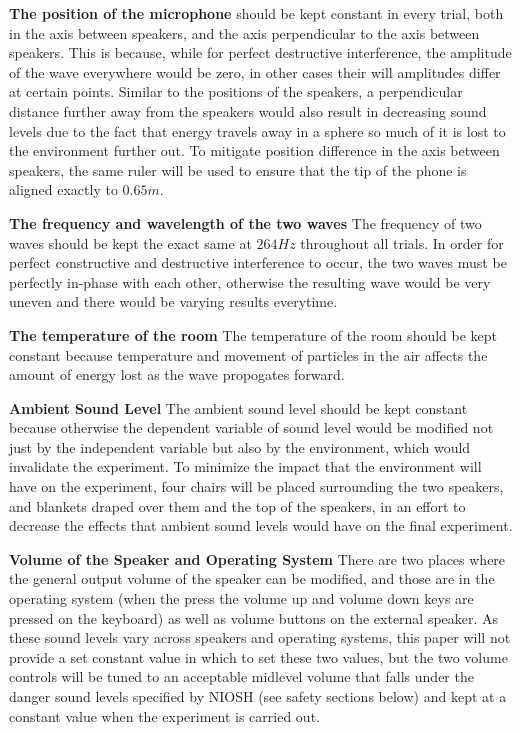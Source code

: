 \documentclass[index]{subfiles}
\begin{document}
\textbf{The position of the microphone} should be kept constant in every trial, both in the axis between speakers, and the axis perpendicular to the axis between speakers. This is because, while for perfect destructive interference, the amplitude of the wave everywhere would be zero, in other cases their will amplitudes differ at certain points. Similar to the positions of the speakers, a perpendicular distance further away from the speakers would also result in decreasing sound levels due to the fact that energy travels away in a sphere so much of it is lost to the environment further out. To mitigate position difference in the axis between speakers, the same ruler will be used to ensure that the tip of the phone is aligned exactly to \(0.65m\).

\textbf{The frequency and wavelength of the two waves} The frequency of two waves should be kept the exact same at \(264Hz\) throughout all trials. In order for perfect constructive and destructive interference to occur, the two waves must be perfectly in-phase with each other, otherwise the resulting wave would be very uneven and there would be varying results everytime.

\textbf{The temperature of the room} The temperature of the room should be kept constant because temperature and movement of particles in the air affects the amount of energy lost as the wave propogates forward.

\textbf{Ambient Sound Level} The ambient sound level should be kept constant because otherwise the dependent variable of sound level would be modified not just by the independent variable but also by the environment, which would invalidate the experiment. To minimize the impact that the environment will have on the experiment, four chairs will be placed surrounding the two speakers, and blankets draped over them and the top of the speakers, in an effort to decrease the effects that ambient sound levels would have on the final experiment.

\textbf{Volume of the Speaker and Operating System} There are two places where the general output volume of the speaker can be modified, and those are in the operating system (when the press the volume up and volume down keys are pressed on the keyboard) as well as volume buttons on the external speaker. As these sound levels vary across speakers and operating systems, this paper will not provide a set constant value in which to set these two values, but the two volume controls will be tuned to an acceptable midlevel volume that falls under the danger sound levels specified by NIOSH (see safety sections below) and kept at a constant value when the experiment is carried out.
\end{document}
